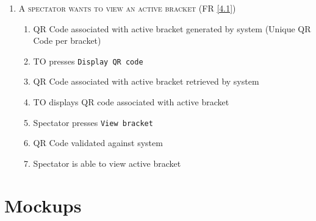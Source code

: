 \documentclass{article}
\begin{document}
\begin{enumerate}
\item{\textsc{A spectator wants to view an active bracket}} (FR \ref{4.1})   \begin{enumerate}[label*=\arabic*.]

\item QR Code associated with active bracket generated by system (Unique QR Code per bracket)
\item TO presses \texttt{Display QR code}
\item QR Code associated with active bracket retrieved by system
\item TO displays QR code associated with active bracket
\item Spectator presses \texttt{View bracket}
\item QR Code validated against system
\item Spectator is able to view active bracket
\end{enumerate}
    
    
\end{enumerate}

\clearpage
\section*{Mockups}
\end{document}

